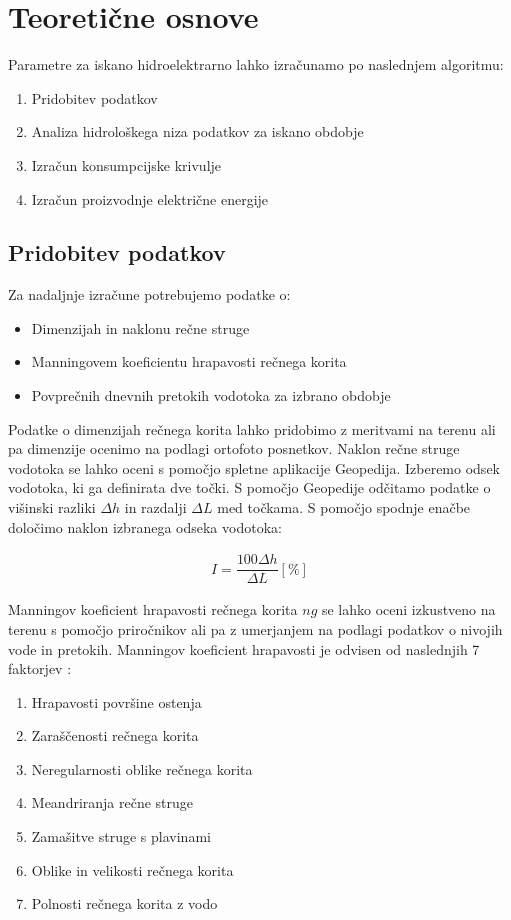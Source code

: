 \chapter{Teoretične osnove}

Parametre za iskano hidroelektrarno lahko izračunamo po naslednjem algoritmu:
\begin{enumerate}[noitemsep, topsep=0pt]
	\item Pridobitev podatkov
	\item Analiza hidrološkega niza podatkov za iskano obdobje
	\item Izračun konsumpcijske krivulje
	\item Izračun proizvodnje električne energije
\end{enumerate}


\section{Pridobitev podatkov} \label{sec:teorija_pridobitevPodatkov}
Za nadaljnje izračune potrebujemo podatke o:
\begin{itemize}[noitemsep, topsep=0pt]
	\item Dimenzijah in naklonu rečne struge
	\item Manningovem koeficientu hrapavosti rečnega korita
	\item Povprečnih dnevnih pretokih vodotoka za izbrano obdobje
\end{itemize}

Podatke o dimenzijah rečnega korita lahko pridobimo z meritvami na terenu ali pa dimenzije ocenimo na podlagi ortofoto posnetkov. Naklon rečne struge vodotoka se lahko oceni s pomočjo spletne aplikacije Geopedija. Izberemo odsek vodotoka, ki ga definirata dve točki. S pomočjo Geopedije odčitamo podatke o višinski razliki $\Delta h$ in razdalji $\Delta L$ med točkama. S pomočjo spodnje enačbe določimo naklon izbranega odseka vodotoka:

\begin{ceqn}
\begin{align}
 I = \dfrac{100\Delta h}{\Delta L} [\%]
\end{align}
\end{ceqn}


  Manningov koeficient hrapavosti rečnega korita $ng$ se lahko oceni izkustveno na terenu s pomočjo priročnikov ali pa z umerjanjem na podlagi podatkov o nivojih vode in pretokih. Manningov koeficient hrapavosti je odvisen od naslednjih 7 faktorjev \cite{VenTeChow}:
 \begin{enumerate}[noitemsep, topsep=0pt]
 	\item Hrapavosti površine ostenja
 	\item Zaraščenosti rečnega korita
 	\item Neregularnosti oblike rečnega korita
 	\item Meandriranja rečne struge
 	\item Zamašitve struge s plavinami 
 	\item Oblike in velikosti rečnega korita
 	\item Polnosti rečnega korita z vodo
 \end{enumerate}
 

